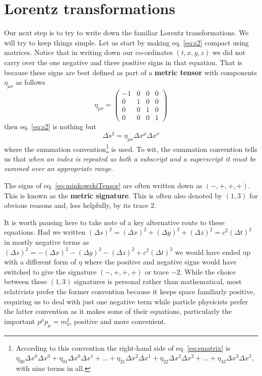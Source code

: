 \documentclass[english,seminar]{lecture}
\begin{document}
%
%
%
%
%
%
%

\section{Lorentz transformations}\label{sec:lorentzTransformations}

Our next step is to try to write down the familiar Lorentz transformations. We will try to keep things simple. Let us start by making eq. \eqref{eq:s2} compact using matrices. Notice that in writing down our co-ordinates $(t,x,y,z)$ we did not carry over the one negative and three positive signs in that equation. That is because these signs are best defined as part of a \textbf{metric tensor} with components $\eta_{\mu\nu}$ as follows
\begin{equation}
\eta_{\mu\nu} =
\begin{pmatrix}
	-1 & 0 & 0 & 0 \\
	0 & 1 & 0 & 0 \\
	0 & 0 & 1 & 0 \\
	0 & 0 & 0 & 1
\end{pmatrix} \label{eq:minkowskiTensor}
\end{equation}%
then eq. \eqref{eq:s2} is nothing but
\begin{equation}
	\Delta s^2 = \eta_{\mu\nu}\Delta x^{\mu}\Delta x^{\nu} \label{eq:smatrix}
\end{equation}%
where the summation convention\footnote{According to this convention the right-hand side of eq. \eqref{eq:smatrix} is $\eta_{00}\Delta x^0\Delta x^0 + \eta_{01}\Delta x^0\Delta x^1 + \ldots + \eta_{21}\Delta x^2\Delta x^1 + \eta_{22}\Delta x^2\Delta x^2 + \ldots + \eta_{33}\Delta x^3\Delta x^3$, with nine terms in all.} is used. To wit, the summation convention tells us that \textit{when an index is repeated as both a subscript and a superscript it must be summed over an appropriate range}.

The signs of eq. \eqref{eq:minkowskiTensor} are often written down as $(-,+,+,+)$. This is known as the \textbf{metric signature}. This is often also denoted by $(1,3)$ for obvious reasons and, less helpfully, by its trace $2$.

It is worth pausing here to take note of a key alternative route to these equations. Had we written $(\Delta s)^2 = (\Delta x)^2 + (\Delta y)^2 + (\Delta z)^2 = c^2 (\Delta t)^2$ in mostly negative terms as $(\Delta s)^2 = - (\Delta x)^2 - (\Delta y)^2 - (\Delta z)^2 + c^2 (\Delta t)^2$ we would have ended up with a different form of $\eta$ where the positive and negative signs would have switched to give the signature $(-,+,+,+)$ or trace $-2$. While the choice between these $(1,3)$ signatures is personal rather than mathematical, most relativists prefer the former convention because it keeps space familiarly positive, requiring us to deal with just one negative term while particle physicists prefer the latter convention as it makes some of their equations, particularly the important $p^\mu p_\mu = m_0^2$, positive and more convenient.
\end{document}
